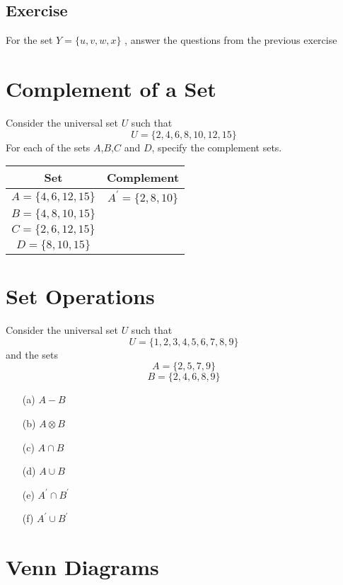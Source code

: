 \documentclass[a4paper,12pt]{article}
\begin{document}
\subsection*{Exercise}
For the set $Y = \{u,v,w,x\}$ , answer the questions from the
previous exercise



\section*{Complement of a Set}
Consider the universal set $U$ such that
\[U=\{2,4,6,8,10,12,15\} \]
For each of the sets $A$,$B$,$C$ and $D$, specify the complement sets.

\begin{center}
\begin{tabular}{|c|c|}
  \hline
Set & Complement\\
\hline $A=\{4,6,12,15\}$ &
$A^{\prime}=\{2,8,10\}$ \\ \hline $B=\{4,8,10,15\}$ & \\ \hline
$C=\{2,6,12,15\}$ & \\ \hline $D=\{8,10,15\}$ & \\ \hline

\end{tabular}
\end{center}



\section*{Set Operations}
Consider the universal set $U$ such that
\[U=\{1,2,3,4,5,6,7,8,9\} \]
and the sets
\[A=\{2,5,7,9\} \]
\[B=\{2,4,6,8,9\} \]

\begin{itemize}
\item[(a)] $A-B$
\item[(b)] $A \otimes B$
\item[(c)] $A \cap B$
\item[(d)] $A \cup B$
\item[(e)] $A^{\prime} \cap B^{\prime}$
\item[(f)] $A^{\prime} \cup B^{\prime}$
\end{itemize}


\section*{Venn Diagrams}
\end{document}
